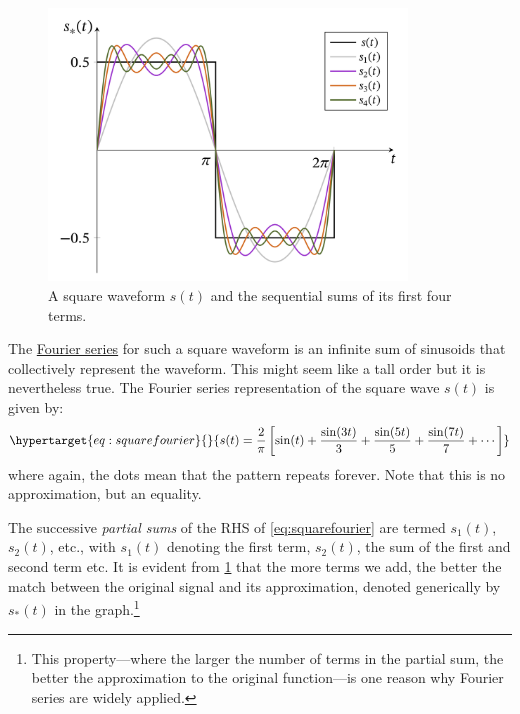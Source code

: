 \documentclass[
  a4paper,
]{article}
\begin{document}
\begin{figure}
\hypertarget{fig:squarefourier}{%
\centering
\includegraphics[width=0.85\textwidth,height=\textheight]{images/squarefourier.png}
\caption{A square waveform \(s(t)\) and the sequential sums of its first
four terms.}\label{fig:squarefourier}
}
\end{figure}

The \href{https://mathworld.wolfram.com/FourierSeries.html}{Fourier
series} for such a square waveform is an infinite sum of sinusoids that
collectively represent the waveform. This might seem like a tall order
but it is nevertheless true. The Fourier series representation of the
square wave \(s(t)\) is given by:
\begin{equation}\protect\hypertarget{eq:squarefourier}{}{
s(t) = \frac{2}{\pi}\left[\sin(t) + \frac{\sin(3t)}{3} + \frac{\sin(5t)}{5} +  \frac{\sin(7t)} {7} + \cdots\right]
}\label{eq:squarefourier}\end{equation} where again, the dots mean that
the pattern repeats forever. Note that this is no approximation, but an
equality.

The successive \emph{partial sums} of the RHS of \cref{eq:squarefourier}
are termed \(s_1(t)\), \(s_2(t)\), etc., with \(s_1(t)\) denoting the
first term, \(s_2(t)\), the sum of the first and second term etc. It is
evident from \cref{fig:squarefourier} that the more terms we add, the
better the match between the original signal and its approximation,
denoted generically by \(s_*(t)\) in the graph.\footnote{This
  property---where the larger the number of terms in the partial sum,
  the better the approximation to the original function---is one reason
  why Fourier series are widely applied.}
\end{document}
